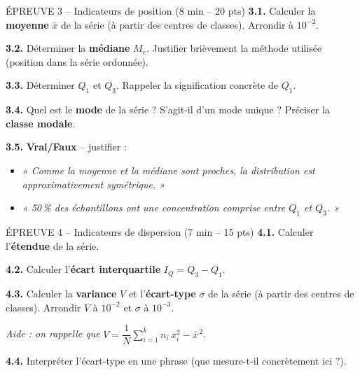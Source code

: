 \documentclass[11pt,a4paper]{article}
\begin{document}
\begin{epreuve}{ÉPREUVE 3 -- Indicateurs de position \hfill \small (8 min -- 20 pts)}
\vspace{0.1cm}
\textbf{3.1.} Calculer la \textbf{moyenne} $\bar{x}$ de la série (à partir des centres de classes). Arrondir à $10^{-2}$.

\vspace{0.2cm}
\textbf{3.2.} Déterminer la \textbf{médiane} $M_e$. Justifier brièvement la méthode utilisée (position dans la série ordonnée).

\vspace{0.2cm}
\textbf{3.3.} Déterminer $Q_1$ et $Q_3$. Rappeler la signification concrète de $Q_1$.

\vspace{0.2cm}
\textbf{3.4.} Quel est le \textbf{mode} de la série ? S'agit-il d'un mode unique ? Préciser la \textbf{classe modale}.

\vspace{0.2cm}
\textbf{3.5.} \textbf{Vrai/Faux} -- justifier :
\begin{itemize}[leftmargin=*,itemsep=2pt]
  \item \emph{« Comme la moyenne et la médiane sont proches, la distribution est approximativement symétrique. »}
  \item \emph{« 50\,\% des échantillons ont une concentration comprise entre $Q_1$ et $Q_3$. »}
\end{itemize}
\end{epreuve}

\vspace{0.3cm}

\begin{epreuve}{ÉPREUVE 4 -- Indicateurs de dispersion \hfill \small (7 min -- 15 pts)}
\textbf{4.1.} Calculer l'\textbf{étendue} de la série.

\vspace{0.2cm}
\textbf{4.2.} Calculer l'\textbf{écart interquartile} $I_Q = Q_3 - Q_1$.

\vspace{0.2cm}
\textbf{4.3.} Calculer la \textbf{variance} $V$ et l'\textbf{écart-type} $\sigma$ de la série (à partir des centres de classes). Arrondir $V$ à $10^{-2}$ et $\sigma$ à $10^{-3}$.

\emph{Aide : on rappelle que } $V = \dfrac{1}{N}\displaystyle\sum_{i=1}^{k} n_i\,x_i^2 - \bar{x}^{\,2}$.

\vspace{0.2cm}
\textbf{4.4.} Interpréter l'écart-type en une phrase (que mesure-t-il concrètement ici ?).
\end{epreuve}
\end{document}
